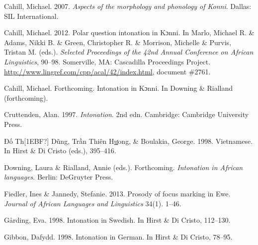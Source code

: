 \documentclass[output=paper]{langsci/langscibook}
\begin{document}
\begin{styleBibliographyiv}
Cahill, Michael. 2007. \emph{Aspects of the morphology and phonology of Konni}. Dallas: SIL International.
\end{styleBibliographyiv}

\begin{styleBibliographyiv}
Cahill, Michael. 2012. Polar question intonation in Kɔnni. In Marlo, Michael R. \& Adams, Nikki B. \& Green, Christopher R. \& Morrison, Michelle \& Purvis,\emph{ }Tristan M. (eds.). \emph{Selected Proceedings of the 42nd Annual Conference on African Linguistics}, 90–98. Somerville, MA: Cascadilla Proceedings Project. \url{http://www.lingref.com/cpp/acal/42/index.html}, document \#2761.
\end{styleBibliographyiv}

\begin{styleReferences}
Cahill, Michael. Forthcoming. Intonation in Kɔnni. In Downing \& Rialland (forthcoming).
\end{styleReferences}

\begin{styleReferences}
Cruttenden, Alan. 1997. \emph{Intonation}. 2nd edn. Cambridge: Cambridge University Press.
\end{styleReferences}

\begin{styleReferences}
Đố Th[1EBF?] D\~{u}ng, Trần Thiên H\href{http://en.wikipedia.org/wiki/Ư}{ư}ong, \& Boulakia, George. 1998. Vietnamese. In Hirst \& Di Cristo (eds.), 395–416.
\end{styleReferences}

\begin{styleBibliographyiv}
Downing, Laura \& Rialland, Annie (eds.). Forthcoming. \emph{Intonation in African languages}. Berlin: DeGruyter Press.
\end{styleBibliographyiv}

\begin{styleBibliographyiv}
Fiedler, Ines \& Jannedy, Stefanie. 2013. Prosody of focus marking in Ewe. \emph{Journal of African Languages and Linguistics}\textit{ }34(1). 1–46.
\end{styleBibliographyiv}

\begin{styleBibliographyiv}
Gårding, Eva. 1998. Intonation in Swedish. In Hirst \& Di Cristo, 112–130. 
\end{styleBibliographyiv}

\begin{styleBibliographyiv}
Gibbon, Dafydd. 1998. Intonation in German. In Hirst \& Di Cristo, 78–95.
\end{styleBibliographyiv}
\end{document}
